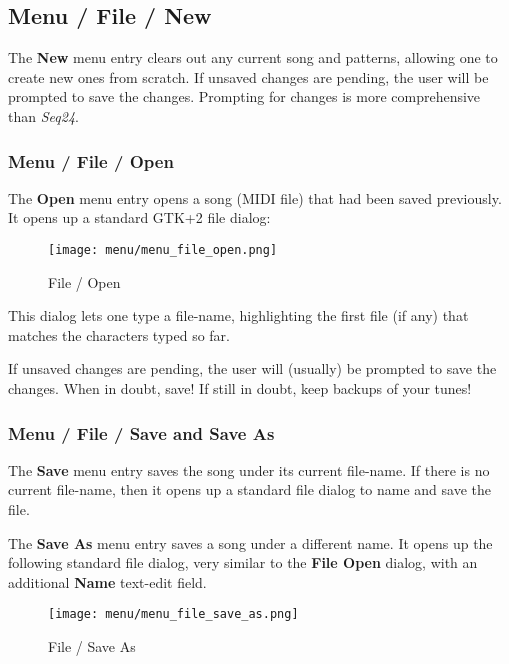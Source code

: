 \subsection{Menu / File / New}
\label{subsec:menu_file_new}

   The \textbf{New} menu entry clears out any current song and patterns,
   allowing one to create new ones from scratch.
   If unsaved changes are pending, the user will be prompted to save the
   changes.  Prompting for changes is more comprehensive than \textsl{Seq24}.

\subsubsection{Menu / File / Open}
\label{subsubsec:seq64_menu_file_open}

   The \textbf{Open} menu entry opens a song (MIDI file)
   that had been saved previously.  It opens up a standard GTK+2 file dialog:

\begin{figure}[H]
   \centering 
   \texttt{[image: menu/menu\_file\_open.png]}
   \caption{File / Open}
   \label{fig:seq64_menu_file_open}
\end{figure}

   This dialog lets one type a file-name, highlighting the first file (if any)
   that matches the characters typed so far.

   If unsaved changes are pending, the user will (usually)
   be prompted to save the changes.
   When in doubt, save!  If still in doubt, keep backups of your tunes!

\subsubsection{Menu / File / Save and Save As}
\label{subsubsec:menu_file_open_save_as}

   The \textbf{Save} menu entry saves the song under its current file-name.
   If there is no current file-name, then it opens up a standard file
   dialog to name and save the file.

   The \textbf{Save As} menu entry saves a song under a different name.
   It opens up the following standard file dialog, very similar to the 
   \textbf{File Open} dialog, with an additional \textbf{Name} text-edit field.

\begin{figure}[H]
   \centering 
   \texttt{[image: menu/menu\_file\_save\_as.png]}
   \caption{File / Save As}
   \label{fig:seq64_menu_file_save_as}
\end{figure}

